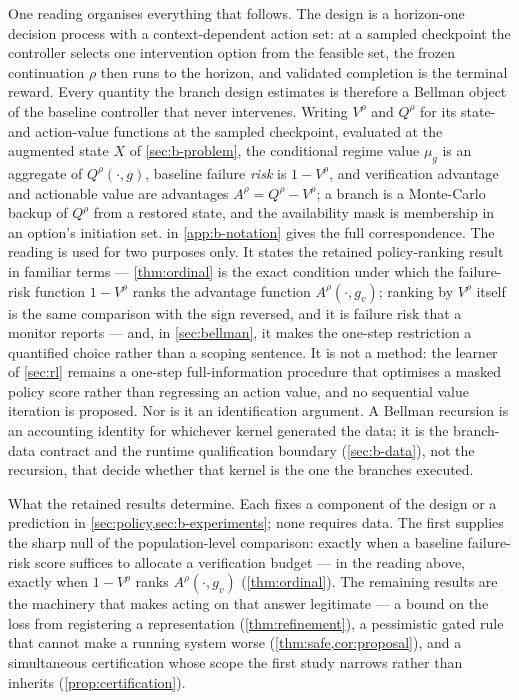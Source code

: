 One reading organises everything that follows.  The design is a horizon-one
decision process with a context-dependent action set: at a sampled checkpoint
the controller selects one intervention option from the feasible set, the frozen
continuation $\rho$ then runs to the horizon, and validated completion is the
terminal reward.  Every quantity the branch design estimates is therefore a
Bellman object of the baseline controller that never intervenes.  Writing
$V^\rho$ and $Q^\rho$ for its state- and action-value functions at the sampled
checkpoint, evaluated at the augmented state $X$ of \cref{sec:b-problem}, the
conditional regime value $\mu_g$ is an aggregate of $Q^\rho(\cdot,g)$, baseline
failure \emph{risk} is $1-V^\rho$, and verification advantage and actionable
value are advantages $A^\rho=Q^\rho-V^\rho$; a branch is a Monte-Carlo backup of
$Q^\rho$ from a restored state, and the availability mask is membership in an
option's initiation set.   in \cref{app:b-notation}
gives the full correspondence.  The reading is used for two purposes only.  It
states the retained policy-ranking result in familiar terms --- \cref{thm:ordinal} is the exact
condition under which the failure-risk function $1-V^\rho$ ranks the advantage
function $A^\rho(\cdot,g_v)$; ranking by $V^\rho$ itself is the same comparison
with the sign reversed, and it is failure risk that a monitor reports --- and,
in \cref{sec:bellman}, it makes the one-step restriction a quantified choice
rather than a scoping sentence.  It is not a method: the learner of
\cref{sec:rl} remains a one-step full-information procedure that optimises a
masked policy score rather than regressing an action value, and no sequential
value iteration is proposed.  Nor is it an identification argument.  A Bellman
recursion is an accounting identity for whichever kernel generated the data; it
is the branch-data contract and the runtime qualification boundary
(\cref{sec:b-data}), not the recursion, that decide whether that kernel is the
one the branches executed.

What the retained results determine.  Each fixes a component of the design or a
prediction in \cref{sec:policy,sec:b-experiments}; none requires data.  The
first supplies the sharp null of the population-level comparison: exactly when
a baseline failure-risk score suffices to allocate a verification budget --- in
the reading above, exactly when $1-V^\rho$ ranks $A^\rho(\cdot,g_v)$
(\cref{thm:ordinal}).  The remaining results are the machinery that makes acting
on that answer legitimate --- a bound on the loss from registering a
representation (\cref{thm:refinement}), a pessimistic gated rule that cannot
make a running system worse (\cref{thm:safe,cor:proposal}), and a simultaneous
certification whose scope the first study narrows rather than inherits
(\cref{prop:certification}).

